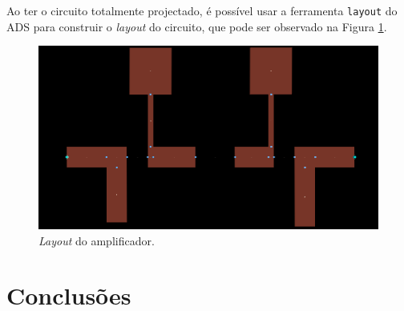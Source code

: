 \documentclass[11pt]{article}
\numberwithin{equation}{section}
\begin{document}
Ao ter o circuito totalmente projectado, é possível usar a ferramenta \texttt{layout} do ADS para construir o \textit{layout} do circuito, que pode ser observado na Figura \ref{fig:layout}.

\begin{figure}[H]
	\centering
	\includegraphics[keepaspectratio=true, scale=0.45]{exps/layout}
	\vspace{-0.5em}
	\caption{\textit{Layout} do amplificador.}
	\vspace{-0.8em}
	\label{fig:layout}
\end{figure}

\section{Conclusões}
\end{document}
